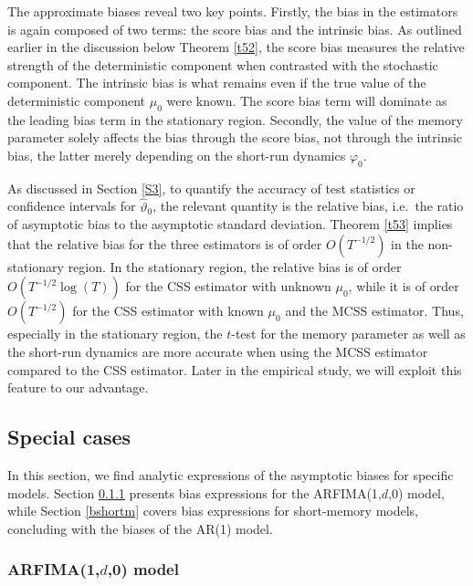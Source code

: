 {{The approximate biases reveal two key points. Firstly, the bias in the estimators is again composed of two terms: the score bias and the intrinsic bias. As outlined earlier in the discussion below Theorem \ref{t52}, the score bias measures the relative strength of the deterministic component when contrasted with the stochastic component. The intrinsic bias is what remains even if the true value of the deterministic component $\mu_0$ were known. The score bias term will dominate as the leading bias term in the stationary region. Secondly, the value of the memory parameter solely affects the bias through the score bias, not through the intrinsic bias, the latter merely depending on the short-run dynamics $\varphi_0$. 


As discussed in Section \ref{S3}, to quantify the accuracy of test statistics or confidence intervals for $\hat{\vartheta}_0$, the relevant quantity is the relative bias, i.e.\ the ratio of asymptotic bias to the asymptotic standard deviation. Theorem \ref{t53} implies that the relative bias for the three estimators is of order $O(T^{-1/2})$ in the non-stationary region. In the stationary region, the relative bias is of order $O(T^{-1/2} \log(T))$ for the CSS estimator with unknown $\mu_0$, while it is of order $O(T^{-1/2})$ for the CSS estimator with known $\mu_0$ and the MCSS estimator. Thus, especially in the stationary region, the $t$-test for the memory parameter as well as the short-run dynamics are more accurate when using the MCSS estimator compared to the CSS estimator. Later in the empirical study, we will exploit this feature to our advantage.   





\subsection{Special cases} \label{specialcases}

In this section, we find analytic expressions of the asymptotic biases for specific models. Section \ref{arfima1d} presents bias expressions for the ARFIMA(1,$d$,0) model, while Section \ref{bshortm} covers bias expressions for short-memory models, concluding with the biases of the AR(1) model.

\subsubsection{ARFIMA(1,\texorpdfstring{\(d\)}{d},0) model} \label{arfima1d}

}}
